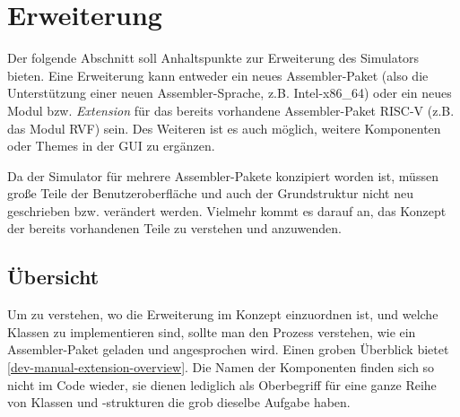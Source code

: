 
\section{Erweiterung}
\label{dev:extension}

Der folgende Abschnitt soll Anhaltspunkte zur Erweiterung des Simulators bieten.
Eine Erweiterung kann entweder ein neues Assembler-Paket (also die Unterstützung
einer neuen Assembler-Sprache, z.B. Intel-x86\_64) oder ein neues Modul bzw.
\emph{Extension} für das bereits vorhandene Assembler-Paket RISC-V (z.B. das
Modul RVF) sein. Des Weiteren ist es auch möglich, weitere Komponenten oder
Themes in der GUI zu ergänzen.

Da der Simulator für mehrere Assembler-Pakete konzipiert worden ist, müssen
große Teile der Benutzeroberfläche und auch der Grundstruktur nicht neu
geschrieben bzw. verändert werden. Vielmehr kommt es darauf an, das Konzept der
bereits vorhandenen Teile zu verstehen und anzuwenden.

\subsection{Übersicht}

Um zu verstehen, wo die Erweiterung im Konzept einzuordnen ist, und welche
Klassen zu implementieren sind, sollte man den Prozess verstehen, wie ein
Assembler-Paket geladen und angesprochen wird. Einen groben Überblick bietet
\autoref{dev-manual-extension-overview}. Die Namen der Komponenten finden sich
so nicht im Code wieder, sie dienen lediglich als Oberbegriff für eine ganze
Reihe von Klassen und -strukturen die grob dieselbe Aufgabe haben.

